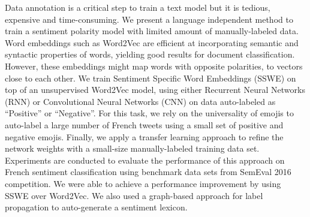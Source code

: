 Data annotation is a critical step to train a text model but it is tedious, expensive and time-consuming. We present a language independent method to train a sentiment polarity model with limited amount of manually-labeled data. Word embeddings such as Word2Vec are efficient at incorporating semantic and syntactic properties of words, yielding good results for document classification. However, these embeddings might map words with opposite polarities, to vectors close to each other. We train Sentiment Specific Word Embeddings (SSWE) on top of an unsupervised Word2Vec model, using either Recurrent Neural Networks (RNN) or Convolutional Neural Networks (CNN) on data auto-labeled as ``Positive'' or ``Negative''. For this task, we rely on the universality of emojis to auto-label a large number of French tweets using a small set of positive and negative emojis.  Finally, we apply a transfer learning approach to refine the network weights with a small-size manually-labeled training data set. Experiments are conducted to evaluate the performance of this approach on French sentiment classification using benchmark data sets from SemEval 2016 competition. We were able to achieve a performance improvement by using SSWE over Word2Vec. We also used a graph-based approach for label propagation to auto-generate a sentiment lexicon.
